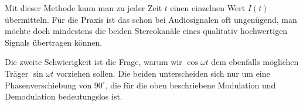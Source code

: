 Mit dieser Methode kann man zu jeder Zeit $t$ einen einzelnen
Wert $I(t)$ übermitteln.
Für die Praxis ist das schon bei Audiosignalen oft ungenügend, man
möchte doch mindestens die beiden Stereokanäle eines qualitativ
hochwertigen Signals übertragen können.

Die zweite Schwierigkeit ist die Frage, warum wir $\cos\omega t$
dem ebenfalls möglichen Träger $\sin\omega t$ vorziehen sollen.
Die beiden unterscheiden sich nur um eine Phasenverschiebung
von $90^\circ$, die für die oben beschriebene Modulation und
Demodulation bedeutungslos ist.






